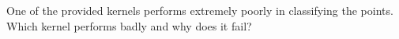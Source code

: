 \item {}

One of the provided kernels performs
extremely poorly in classifying the points. Which kernel performs badly and why
does it fail?

